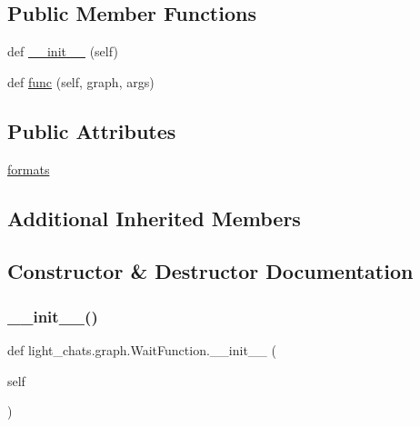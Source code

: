 \subsection*{Public Member Functions}
\begin{DoxyCompactItemize}
\item 
def \hyperlink{classlight__chats_1_1graph_1_1WaitFunction_a08ecc57f17be491ed6a1ee81f38d8d65}{\+\_\+\+\_\+init\+\_\+\+\_\+} (self)
\item 
def \hyperlink{classlight__chats_1_1graph_1_1WaitFunction_a3349dc4d65c4b33440624bdbbeeb420c}{func} (self, graph, args)
\end{DoxyCompactItemize}
\subsection*{Public Attributes}
\begin{DoxyCompactItemize}
\item 
\hyperlink{classlight__chats_1_1graph_1_1WaitFunction_a02e41ee37f4a2fe83153606100a5f979}{formats}
\end{DoxyCompactItemize}
\subsection*{Additional Inherited Members}


\subsection{Constructor \& Destructor Documentation}
\mbox{\label{classlight__chats_1_1graph_1_1WaitFunction_a08ecc57f17be491ed6a1ee81f38d8d65}} 
\subsubsection{\texorpdfstring{\+\_\+\+\_\+init\+\_\+\+\_\+()}{\_\_init\_\_()}}
{\footnotesize\ttfamily def light\+\_\+chats.\+graph.\+Wait\+Function.\+\_\+\+\_\+init\+\_\+\+\_\+ (\begin{DoxyParamCaption}\item[{}]{self }\end{DoxyParamCaption})}



